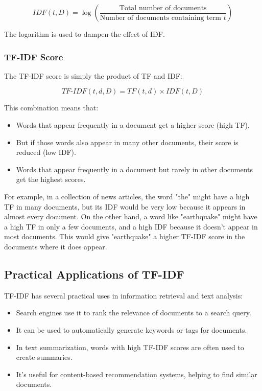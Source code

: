 \documentclass{article}
\begin{document}
\begin{equation}
IDF(t,D) = \log \left(\frac{\text{Total number of documents}}{\text{Number of documents containing term } t}\right)
\end{equation}

The logarithm is used to dampen the effect of IDF.

\subsubsection{TF-IDF Score}
The TF-IDF score is simply the product of TF and IDF:

\begin{equation}
TF\text{-}IDF(t,d,D) = TF(t,d) \times IDF(t,D)
\end{equation}

This combination means that:
\begin{itemize}
    \item Words that appear frequently in a document get a higher score (high TF).
    \item But if those words also appear in many other documents, their score is reduced (low IDF).
    \item Words that appear frequently in a document but rarely in other documents get the highest scores.
\end{itemize}

For example, in a collection of news articles, the word "the" might have a high TF in many documents, but its IDF would be very low because it appears in almost every document. On the other hand, a word like "earthquake" might have a high TF in only a few documents, and a high IDF because it doesn't appear in most documents. This would give "earthquake" a higher TF-IDF score in the documents where it does appear.

\subsection{Practical Applications of TF-IDF}
TF-IDF has several practical uses in information retrieval and text analysis:

\begin{itemize}
    \item Search engines use it to rank the relevance of documents to a search query.
    \item It can be used to automatically generate keywords or tags for documents.
    \item In text summarization, words with high TF-IDF scores are often used to create summaries.
    \item It's useful for content-based recommendation systems, helping to find similar documents.
\end{itemize}
\end{document}
